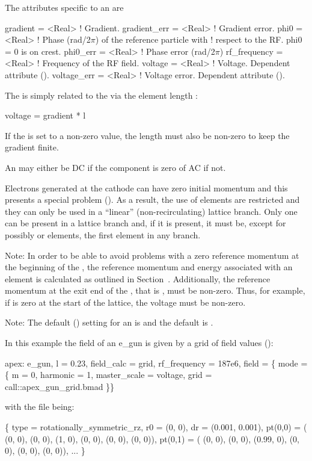 The attributes specific to an  are 
\begin{example}
  gradient     = <Real>    ! Gradient.
  gradient_err = <Real>    ! Gradient error.
  phi0         = <Real>    ! Phase (rad/2\(\pi\)) of the reference particle with 
                           !   respect to the RF. phi0 = 0 is on crest.
  phi0_err     = <Real>    ! Phase error (rad/2\(\pi\))
  rf_frequency = <Real>    ! Frequency of the RF field.
  voltage      = <Real>    ! Voltage. Dependent attribute (). 
  voltage_err  = <Real>    ! Voltage error. Dependent attribute (). 
\end{example}
The  is simply related to the  via the element length :
\begin{example}
  voltage = gradient * l
\end{example}
If the  is set to a non-zero value, the length  must
also be non-zero to keep the gradient finite.

An  may either be DC if the  component is
zero of AC if not.

Electrons generated at the cathode can have zero initial momentum and
this presents a special problem (). As a result, the
use of  elements are restricted and they can only be used in
a ``linear'' (non-recirculating) lattice branch. Only one 
can be present in a lattice branch and, if it is present, it must be,
except for possibly  or  elements, the first
element in any branch.
 
Note: In order to be able to avoid problems with a zero reference
momentum at the beginning of the , the reference momentum
and energy associated with an  element is calculated as
outlined in Section~. Additionally, the reference
momentum at the exit end of the , that is , must be
non-zero. Thus, for example, if  is zero at the start of the
lattice, the  voltage must be non-zero. 

Note: The default  () setting for an
 is  and the default
 is .

In this example the field of an e_gun is given by a grid of field
values ():
\begin{example}
  apex: e_gun, l = 0.23, field_calc = grid, rf_frequency = 187e6, 
    field = \{ mode = \{
      m = 0, harmonic = 1,
      master_scale = voltage,
      grid = call::apex_gun_grid.bmad \}\}
\end{example}
with the file  being:
\begin{example}
  \{
    type = rotationally_symmetric_rz,
    r0 = (0, 0),
    dr = (0.001, 0.001),
    pt(0,0) = ( (0, 0), (0, 0), (1, 0),  (0, 0), (0, 0), (0, 0)),
    pt(0,1) = ( (0, 0), (0, 0), (0.99, 0),  (0, 0), (0, 0), (0, 0)),
    ... \}
\end{example}

